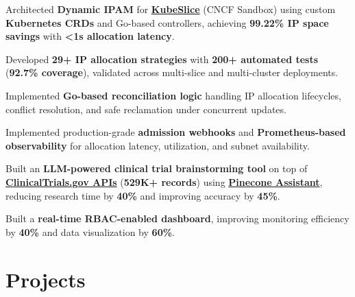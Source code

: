 \documentclass[]{deedy-resume-openfont}
\begin{document}
\begin{minipage}[t]{0.66\textwidth}
\sectionsep

\begin{tightemize}
\item Architected \textbf{Dynamic IPAM} for \href{https://kubeslice.io/}{\textbf{KubeSlice}} (CNCF Sandbox) using custom \textbf{Kubernetes CRDs} and Go-based controllers, achieving \textbf{99.22\% IP space savings} with \textbf{<1s allocation latency}.
\item Developed \textbf{29+ IP allocation strategies} with \textbf{200+ automated tests} (\textbf{92.7\% coverage}), validated across multi-slice and multi-cluster deployments.
\item Implemented \textbf{Go-based reconciliation logic} handling IP allocation lifecycles, conflict resolution, and safe reclamation under concurrent updates.
\item Implemented production-grade \textbf{admission webhooks} and \textbf{Prometheus-based observability} for allocation latency, utilization, and subnet availability.
\end{tightemize}

\sectionsep

\begin{tightemize}
\item Built an \textbf{LLM-powered clinical trial brainstorming tool} on top of \href{https://clinicaltrials.gov/data-api/api}{\textbf{ClinicalTrials.gov APIs}} (\textbf{529K+ records}) using \href{https://www.pinecone.io/}{\textbf{Pinecone Assistant}}, reducing research time by \textbf{40\%} and improving accuracy by \textbf{45\%}.
\item Built a \textbf{real-time RBAC-enabled dashboard}, improving monitoring efficiency by \textbf{40\%} and data visualization by \textbf{60\%}.
\end{tightemize}

\sectionsep

\section{Projects}


\end{minipage}
\end{document}
